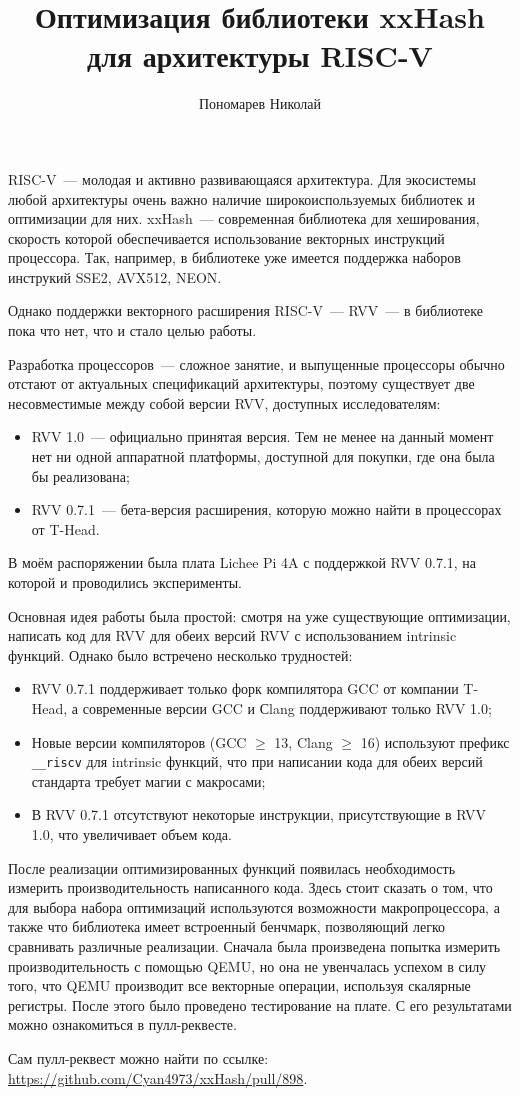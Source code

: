 \documentclass[12pt, a4paper, oneside]{memoir}
\title{Оптимизация библиотеки xxHash для архитектуры RISC-V}
\author{Пономарев Николай}
\date{}
\begin{document}
\maketitle


RISC-V~--- молодая и активно развивающаяся архитектура. Для экосистемы любой архитектуры очень важно наличие широкоиспользуемых библиотек и оптимизации для них.
xxHash~--- современная библиотека для хеширования, скорость которой обеспечивается использование векторных инструкций процессора.
Так, например, в библиотеке уже имеется поддержка наборов инструкий SSE2, AVX512, NEON.

Однако поддержки векторного расширения RISC-V~--- RVV~--- в библиотеке пока что нет, что и стало целью работы.

Разработка процессоров~--- сложное занятие, и выпущенные процессоры обычно отстают от актуальных спецификаций архитектуры, поэтому существует две несовместимые между собой версии RVV, доступных исследователям:
\begin{itemize}
    \item RVV 1.0~--- официально принятая версия. Тем не менее на данный момент нет ни одной аппаратной платформы, доступной для покупки, где она была бы реализована;
    \item RVV 0.7.1~--- бета-версия расширения, которую можно найти в процессорах от T-Head.
\end{itemize}

В моём распоряжении была плата Lichee Pi 4A с поддержкой RVV 0.7.1, на которой и проводились эксперименты.

Основная идея работы была простой: смотря на уже существующие оптимизации, написать код для RVV для обеих версий RVV с использованием intrinsic функций.
Однако было встречено несколько трудностей:

\begin{itemize}
    \item RVV 0.7.1 поддерживает только форк компилятора GCC от компании T-Head, а современные версии GCC и Сlang поддерживают только RVV 1.0;
    \item Новые версии компиляторов (GCC $\ge$ 13, Clang $\ge$ 16) используют префикс \texttt{\_\_riscv} для intrinsic функций, что при написании кода для обеих версий стандарта требует магии с макросами;
    \item В RVV 0.7.1 отсутствуют некоторые инструкции, присутствующие в RVV 1.0, что увеличивает объем кода.
\end{itemize}

После реализации оптимизированных функций появилась необходимость измерить производительность написанного кода.
Здесь стоит сказать о том, что для выбора набора оптимизаций используются возможности макропроцессора, а также что библиотека имеет встроенный бенчмарк, позволяющий легко сравнивать различные реализации.
Сначала была произведена попытка измерить производительность с помощью QEMU, но она не увенчалась успехом в силу того, что QEMU производит все векторные операции, используя скалярные регистры.
После этого было проведено тестирование на плате.
С его результатами можно ознакомиться в пулл-реквесте.


Сам пулл-реквест можно найти по ссылке: \url{https://github.com/Cyan4973/xxHash/pull/898}.
\end{document}
